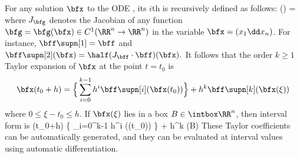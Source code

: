 
	For any solution $\bfx$ to the
	ODE , its $i$th 
	is recursively defined as follows:
			\bff\supn[i](\bfx) =
		\eeql
	where $J_\bfg$ denotes the Jacobian of any function
	$\bfg=\bfg(\bfx)\in C^1(\RR^n\to\RR^n)$
	in the variable $\bfx=(x_1\dd x_n)$.
	For instance,
		$\bff\supn[1] = \bff$
	and
		$\bff\supn[2](\bfx) = \half (J_\bff\cdot \bff)(\bfx).$
	It follows that the order $k\ge 1$ Taylor expansion of $\bfx$
	at the point $t=t_0$ is
		$$\bfx(t_0+h) = \Big\{
				\sum_{i=0}^{k-1} h^i \bff\supn[i](\bfx(t_0)) \Big\}
					+ h^k \bff\supn[k](\bfx(\xi))
		$$
	where $0\le \xi-t_0 \le h$. 
	If $\bfx(\xi)$ lies in a box $B\in\intbox\RR^n$,
	then interval form is
			\bfx(t_0+h) \in \Big\{
				\sum_{i=0}^{k-1} h^i \bff\supn[i](\bfx(t_0)) \Big\}
					+ h^k \bff\supn[k](B) \eeql
	These Taylor coefficients
	can be automatically generated, and they can be evaluated
	at interval values using automatic
	differentiation. %

